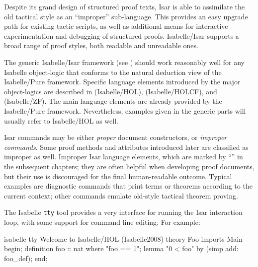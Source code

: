 \begin{isabellebody}
\begin{isamarkuptext}
  Despite its grand design of structured proof texts, Isar is able to
  assimilate the old tactical style as an ``improper'' sub-language.
  This provides an easy upgrade path for existing tactic scripts, as
  well as additional means for interactive experimentation and
  debugging of structured proofs.  Isabelle/Isar supports a broad
  range of proof styles, both readable and unreadable ones.

  \medskip The generic Isabelle/Isar framework (see
  ) should work reasonably well for any
  Isabelle object-logic that conforms to the natural deduction view of
  the Isabelle/Pure framework.  Specific language elements introduced
  by the major object-logics are described in 
  (Isabelle/HOL),  (Isabelle/HOLCF), and 
  (Isabelle/ZF).  The main language elements are already provided by
  the Isabelle/Pure framework. Nevertheless, examples given in the
  generic parts will usually refer to Isabelle/HOL as well.

  \medskip Isar commands may be either \emph{proper} document
  constructors, or \emph{improper commands}.  Some proof methods and
  attributes introduced later are classified as improper as well.
  Improper Isar language elements, which are marked by ``\isa{{\isachardoublequote}\isactrlsup {\isacharasterisk}{\isachardoublequote}}'' in the subsequent chapters; they are often helpful
  when developing proof documents, but their use is discouraged for
  the final human-readable outcome.  Typical examples are diagnostic
  commands that print terms or theorems according to the current
  context; other commands emulate old-style tactical theorem proving.%
\end{isamarkuptext}%
\isamarkuptrue%
%
\isamarkuptrue%
%
\isamarkuptrue%
%
\begin{isamarkuptext}%
The Isabelle \texttt{tty} tool provides a very interface for running
  the Isar interaction loop, with some support for command line
  editing.  For example:
\begin{ttbox}
isabelle tty\medskip
{\out Welcome to Isabelle/HOL (Isabelle2008)}\medskip
theory Foo imports Main begin;
definition foo :: nat where "foo == 1";
lemma "0 < foo" by (simp add: foo_def);
end;
\end{ttbox}


\end{isamarkuptext}
\end{isabellebody}
